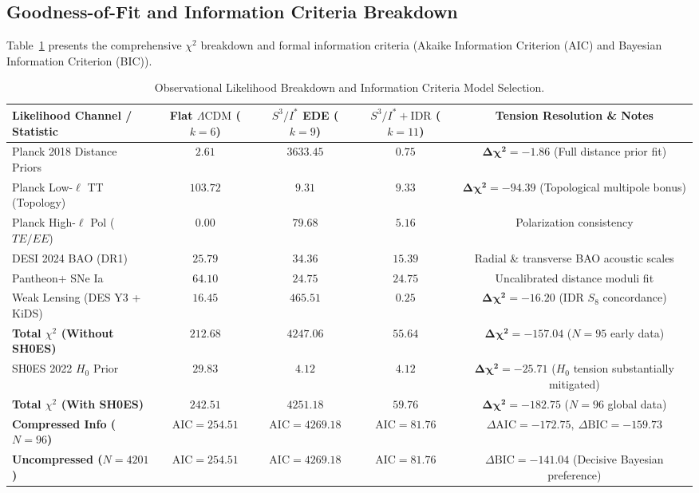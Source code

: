 \documentclass[11pt,a4paper]{article}
\theoremstyle{definition}
\newcommand{\LCDM}{\Lambda\mathrm{CDM}}
\newcommand{\IDR}{\mathrm{IDR}}
\begin{document}
\subsection{Goodness-of-Fit and Information Criteria Breakdown}

Table~\ref{tab:chi2} presents the comprehensive $\chi^2$ breakdown and formal information criteria (Akaike Information Criterion (AIC) and Bayesian Information Criterion (BIC)).

\begin{table}[htbp]
\centering
\caption{Observational Likelihood Breakdown and Information Criteria Model Selection.}
\label{tab:chi2}
\vspace{0.4em}
\begin{tabular}{lcccc}
\toprule
\textbf{Likelihood Channel / Statistic} & \textbf{Flat $\LCDM$ ($k=6$)} & \textbf{$S^3 / I^*$ EDE ($k=9$)} & \textbf{$S^3 / I^* + \IDR$ ($k=11$)} & \textbf{Tension Resolution \& Notes} \\
\midrule
Planck 2018 Distance Priors & $2.61$ & $3633.45$ & $\mathbf{0.75}$ & $\mathbf{\Delta\chi^2 = -1.86}$ (Full distance prior fit) \\
Planck Low-$\ell$ TT (Topology) & $103.72$ & $\mathbf{9.31}$ & $\mathbf{9.33}$ & $\mathbf{\Delta\chi^2 = -94.39}$ (Topological multipole bonus) \\
Planck High-$\ell$ Pol ($TE/EE$) & $0.00$ & $79.68$ & $\mathbf{5.16}$ & Polarization consistency \\
DESI 2024 BAO (DR1) & $25.79$ & $34.36$ & $\mathbf{15.39}$ & Radial \& transverse BAO acoustic scales \\
Pantheon+ SNe Ia & $64.10$ & $24.75$ & $\mathbf{24.75}$ & Uncalibrated distance moduli fit \\
Weak Lensing (DES Y3 + KiDS) & $16.45$ & $465.51$ & $\mathbf{0.25}$ & $\mathbf{\Delta\chi^2 = -16.20}$ (IDR $S_8$ concordance) \\
\midrule
\textbf{Total $\chi^2$ (Without SH0ES)} & $\mathbf{212.68}$ & $\mathbf{4247.06}$ & $\mathbf{55.64}$ & $\mathbf{\Delta\chi^2 = -157.04}$ ($N=95$ early data) \\
SH0ES 2022 $H_0$ Prior & $29.83$ & $4.12$ & $\mathbf{4.12}$ & $\mathbf{\Delta\chi^2 = -25.71}$ ($H_0$ tension substantially mitigated) \\
\midrule
\textbf{Total $\chi^2$ (With SH0ES)} & $\mathbf{242.51}$ & $\mathbf{4251.18}$ & $\mathbf{59.76}$ & $\mathbf{\Delta\chi^2 = -182.75}$ ($N=96$ global data) \\
\textbf{Compressed Info ($N=96$)} & $\mathrm{AIC} = 254.51$ & $\mathrm{AIC} = 4269.18$ & $\mathbf{\mathrm{AIC} = 81.76}$ & $\Delta\mathrm{AIC} = -172.75,\ \Delta\mathrm{BIC} = -159.73$ \\
\textbf{Uncompressed ($N=4201$)} & $\mathrm{AIC} = 254.51$ & $\mathrm{AIC} = 4269.18$ & $\mathbf{\mathrm{AIC} = 81.76}$ & $\Delta\mathrm{BIC} = -141.04$ (Decisive Bayesian preference) \\
\bottomrule
\end{tabular}
\end{table}
\end{document}

